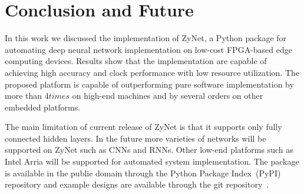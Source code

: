 \section{Conclusion and Future}
\label{sec:conclusion}
In this work we discussed the implementation of ZyNet, a Python package for automating deep neural network implementation on low-cost FPGA-based edge computing devices.
Results show that the implementation are capable of achieving high accuracy and clock performance with low resource utilization.
The proposed platform is capable of outperforming pure software implementation by more than 4$times$ on high-end machines and by several orders on other embedded platforms.

The main limitation of current release of ZyNet is that it supports only fully connected hidden layers.
In the future more varieties of networks will be supported on ZyNet such as CNNs and RNNs.
Other low-end platforms such as Intel Arria will be supported for automated system implementation.
The package is available in the public domain through the Python Package Index~(PyPI) repository and example designs are available through the git repository~\cite{zynetgit}. 